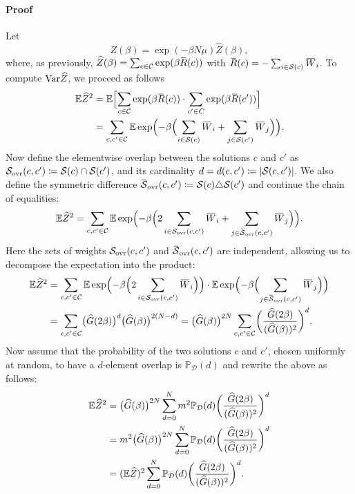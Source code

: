 \paragraph{Proof}
Let
\begin{equation}
Z(\beta) = \exp(-\beta N \mu) \hat{Z}(\beta),
\end{equation}
where, as previously, $\hat{Z}(\beta)=\sum_{c \in \C} \exp(\beta \bar{R}(c))$
with $\bar{R}(c)=-\sum_{i \in \S(c)} \bar{W}_i$.
To compute $\Var \widehat Z$, we proceed as follows
\begin{align}
  \Expct \widehat{Z}^2 &= \Expct \Bigl[ \sum_{c \in \C} \exp(\beta \bar{R}(c)) 
    \cdot \sum_{c' \in C} \exp(\beta \bar{R}(c')) \Bigr] \\ \notag
  &= \sum_{c, c' \in \C} \Expct  \exp\Bigl( -\beta \Bigl( \sum_{i \in \S(c)} 
    \bar{W}_i + \sum_{j \in \S(c')} \bar{W}_j \Bigr) \Bigr).
\end{align}
Now define the elementwise overlap between the solutions $c$ and $c'$ as
$\S_{\mathrm{ovr}}(c,c') \coloneqq \S(c)
\cap \S(c')$, and its cardinality $d = d(c,c') \coloneqq |\S(c, c')|$. 
We also define the symmetric difference $\bar \S_{\mathrm{ovr}}(c,c') \coloneqq \S(c)
\triangle \S(c')$ and continue the chain of equalities:
\begin{equation}
\Expct \widehat{Z}^2 
  = \sum_{c, c' \in \C} \Expct \exp\Bigl( 
    -\beta \Bigl( 
      2\sum_{i \in \S_{\mathrm{ovr}}(c,c')} \bar{W}_i 
      + \sum_{j \in \bar\S_{\mathrm{ovr}}(c,c')} \bar{W}_j 
    \Bigr)  
  \Bigr).
\end{equation}
Here the sets of weights $\S_{\mathrm{ovr}}(c,c')$ and  $\bar\S_{\mathrm{ovr}}(c, c')$ are independent, 
allowing us to decompose the expectation into the product:
\begin{align}
\Expct \widehat{Z}^2 
  &= \sum_{c, c' \in \C} \Expct \exp\Bigl( -\beta 
      \Bigl( 2\sum_{i \in \S_{\mathrm{ovr}}(c,c')} \bar{W}_i \Bigr) 
    \Bigr) 
    \cdot 
    \Expct  \exp\Bigl( -\beta 
      \Bigl( \sum_{j \in \bar\S_{\mathrm{ovr}}(c,c')}\bar{W}_j \Bigr)  
    \Bigr) 
    \notag \\
  &= \sum_{c, c' \in \C} 
    \bigl( {\hG}(2\beta) \bigr)^d \bigl({\hG}(\beta) \bigr)^{2(N-d)} 
  = \bigl( {\hG}(\beta) \bigr)^{2N} \sum_{c, c' \in \C} 
    \biggl( \frac{{\hG}(2\beta)}{({\hG}(\beta))^2} \biggr)^d.
\end{align}
Now assume that the probability of the two solutions $c$ and $c'$,
chosen uniformly at random, to have a $d$-element overlap is
$\mathbb P_{\mathcal{D}}(d)$ and rewrite the above as follows:
\begin{align}
  \Expct \widehat{Z}^2
    &= \bigl( {\hG}(\beta) \bigr)^{2N} \sum_{d = 0}^N m^2 \mathbb P_{\mathcal{D}}(d) 
      \biggl( \frac{{\hG} (2\beta)}{({\hG}(\beta))^2}\biggr)^d \notag \\
    &= m^2  \bigl( {\hG}(\beta) \bigr)^{2N}  \sum_{d = 0}^N \mathbb P_{\mathcal{D}}(d) 
      \biggl( \frac{{\hG}(2\beta)}{( {\hG} (\beta)) ^2}\biggr)^d 
  \notag \\
    &= (\Expct \widehat{Z})^2 \sum_{d = 0}^N \mathbb P_{\mathcal{D}}(d) 
      \biggl( \frac{{\hG}(2\beta)}{( {\hG}(\beta) )^2} \biggr)^d . 
\end{align}

